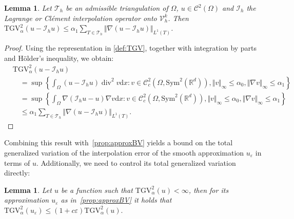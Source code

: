 \documentclass{article}
\DeclareMathOperator{\Div}{div}
\newcommand{\dx}{\mathrm{d}}
\newcommand{\R}{\mathbb{R}}
\newcommand{\TGV}{\mathrm{TGV}}
\newtheorem{lemma}[theorem]{Lemma}
\begin{document}
	\begin{lemma}
		\label{lem:BoundDiscreteTGVdiff}
		Let $\mathcal{T}_h$ be an admissible triangulation of $\Omega$, $u \in \mathcal{C}^2(\Omega)$ and $\mathcal{I}_h$ the Lagrange or Clément interpolation operator onto $ \mathcal{V}_h^k$.
		Then $\TGV_{\alpha}^2(u - \mathcal{I}_h u) \leq \alpha_1 \sum_{T \in \mathcal{T}_h} \Vert \nabla(u - \mathcal{I}_h u)\Vert _{L^1(T)}$.
	\end{lemma}
	\begin{proof}
		Using the representation in \eqref{def:TGV}, together with integration by parts and Hölder's inequality, we obtain:
		\begin{align*}
			&\TGV_{\alpha}^2(u - \mathcal{I}_h u)\\
			&\quad= \sup \left \lbrace  \int_\Omega(u - \mathcal{I}_h u)  \Div^2v \dx x\colon v \in \mathcal{C}_c^2(\Omega, \mathrm{Sym}^2(\R^d)),  \Vert v\Vert _\infty \leq \alpha_0, \Vert \nabla v\Vert _\infty \leq \alpha_1\right \rbrace\\
			&\quad= \sup \left \lbrace  \int_\Omega \nabla(\mathcal{I}_h u - u)  \nabla v \dx x\colon v \in \mathcal{C}_c^2(\Omega, \mathrm{Sym}^2(\R^d)), \Vert v\Vert _\infty \leq \alpha_0, \Vert \nabla v\Vert _\infty \leq \alpha_1\right \rbrace\\
			&\quad \leq \alpha_1 \sum_{T \in \mathcal{T}_h} \Vert \nabla(u - \mathcal{I}_h u)\Vert _{L^1(T)}.
		\end{align*}
	\end{proof}
	Combining this result with~\cref{prop:approxBV} yields a bound on the total generalized variation of the interpolation error of the smooth approximation $u_\varepsilon$ in terms of $u$.
	Additionally, we need to control its total generalized variation directly:
	\begin{lemma}
		\label{lem:approxTGV}
		Let $u$ be a function such that $\TGV_\alpha^2(u)<\infty$, then for its approximation $u_\varepsilon$ as in~\cref{prop:approxBV} it holds that
		$
		\TGV_\alpha^2(u_\varepsilon) \leq (1 + c\varepsilon) \TGV_\alpha^2(u).
		$
	\end{lemma}
\end{document}
